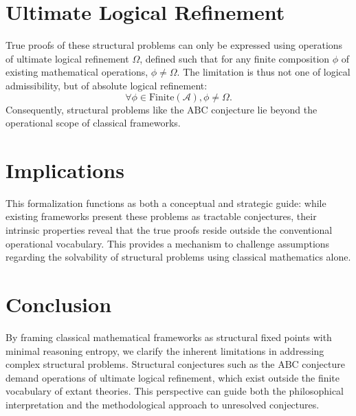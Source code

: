 \documentclass[12pt]{article}
\begin{document}
\section{Ultimate Logical Refinement}
True proofs of these structural problems can only be expressed using operations of ultimate logical refinement $\Omega$, defined such that for any finite composition $\phi$ of existing mathematical operations, $\phi \neq \Omega$. The limitation is thus not one of logical admissibility, but of absolute logical refinement:
\[
\forall \phi \in \mathrm{Finite} (\mathcal{A}), \phi \neq \Omega.
\]
Consequently, structural problems like the $\mathrm{ABC}$ conjecture lie beyond the operational scope of classical frameworks.

\section{Implications}
This formalization functions as both a conceptual and strategic guide: while existing frameworks present these problems as tractable conjectures, their intrinsic properties reveal that the true proofs reside outside the conventional operational vocabulary. This provides a mechanism to challenge assumptions regarding the solvability of structural problems using classical mathematics alone.

\section{Conclusion}
By framing classical mathematical frameworks as structural fixed points with minimal reasoning entropy, we clarify the inherent limitations in addressing complex structural problems. Structural conjectures such as the $\mathrm{ABC}$ conjecture demand operations of ultimate logical refinement, which exist outside the finite vocabulary of extant theories. This perspective can guide both the philosophical interpretation and the methodological approach to unresolved conjectures.
\end{document}
